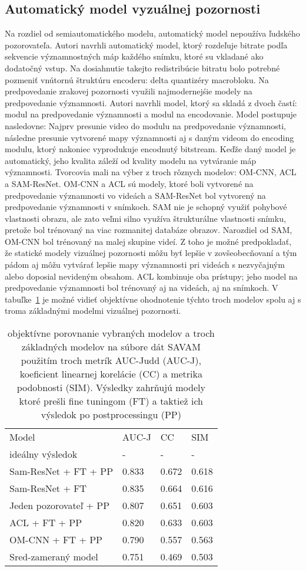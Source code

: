 \documentclass[10pt,twoside,slovak,a4paper]{article}
\begin{document}
\subsection{Automatický model vyzuálnej pozornosti} \label{auto}
Na rozdiel od semiautomatického modelu, automatický model nepoužíva ľudského pozorovateľa. Autori\cite{Czarnecki:Progress} navrhli automatický model, ktorý rozdeľuje bitrate podľa sekvencie významnostných máp každého snímku, ktoré su vkladané ako dodatočný vstup. Na dosiahnutie takejto redistribúcie bitratu bolo potrebné pozmeniť vnútornú štruktúru encoderu: delta quantizéry macrobloku. Na predpovedanie zrakovej pozornosti využili najmodernejśie modely na predpovedanie významnosti. Autori\cite{Czarnecki:Progress} navrhli model, ktorý sa skladá z dvoch častí: modul na predpovedanie významnosti a modul na encodovanie. Model postupuje nasledovne: Najprv presunie video do modulu na predpovedanie významnosti, následne presunie vytvorené mapy významnosti aj s daným videom do encoding modulu, ktorý nakoniec vyprodukuje encodnutý bitstream. Keďže daný model je automatický, jeho kvalita záleží od kvality modelu na vytváranie máp významnosti. Tvorcovia mali na výber z troch rôznych modelov: OM-CNN, ACL a SAM-ResNet. OM-CNN a ACL sú modely, ktoré boli vytvorené na predpovedanie významnosti vo videách a SAM-ResNet bol vytvorený na predpovedanie významnosti v snímkoch. SAM nie je schopný využiť pohybové vlastnosti obrazu, ale zato veľmi silno využíva štrukturálne vlastnosti snímku, pretože bol trénovaný na viac rozmanitej databáze obrazov. Narozdiel od SAM, OM-CNN bol trénovaný na malej skupine videí. Z toho je možné predpokladať, že statické modely vizuálnej pozornosti môžu byť lepšie v zovšeobecňovaní a tým pádom aj môžu vytvárať lepšie mapy významnosti pri videách s nezvyčajným alebo doposial nevideným obsahom. ACL kombinuje oba prístupy; jeho model na predpovedanie významnosti bol trénovaný aj na videách, aj na snímkoch. V tabuľke~\ref{tab:mapy} je možné vidieť objektívne ohodnotenie týchto troch modelov spolu aj s troma základnými modelmi vizuálnej pozornosti.
\begin{table}[h]
\caption{objektívne porovnanie vybraných modelov a troch základných modelov na súbore dát SAVAM použitím troch metrík AUC-Judd (AUC-J), koeficient linearnej korelácie (CC) a metrika podobnosti (SIM). Výsledky zahrňujú modely ktoré prešli fine tuningom (FT) a taktiež ich výsledok po postprocessingu (PP)\\}
\label{tab:mapy}
\begin{tabular}{llll}
Model                  & AUC-J & CC    & SIM   \\
ideálny výsledok       & -     & -     & -     \\
Sam-ResNet + FT + PP   & 0.833 & 0.672 & 0.618 \\
Sam-ResNet + FT        & 0.835 & 0.664 & 0.616 \\
Jeden pozorovateľ + PP & 0.807 & 0.651 & 0.603 \\
ACL + FT + PP          & 0.820 & 0.633 & 0.603 \\
OM-CNN + FT + PP       & 0.790 & 0.557 & 0.563 \\
Sred-zameraný model    & 0.751 & 0.469 & 0.503
\end{tabular}
\end{table}
\end{document}
